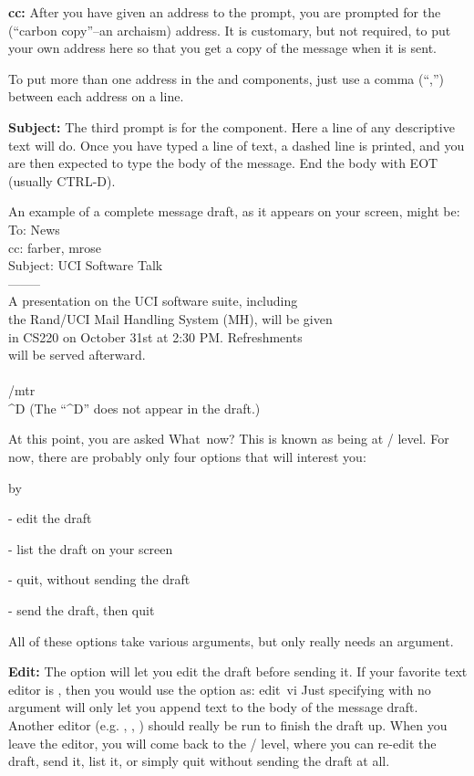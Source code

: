 {\bf cc:}
After you have given an address to the  prompt, 
you are prompted for the 
(``carbon copy''--an archaism)
address.
It is customary, but not required, to put your own address
here so that you get a copy of the message when it is sent.

To put more than one address in the  and
 components,
just use a comma (``,'') between each address on a line.

{\bf Subject:}
The third prompt is for the  component.
Here a line of any descriptive text will do.
Once you have typed a line of text, a dashed line is printed,
and you are then expected to type the body of the message.
End the body with EOT (usually CTRL-D).

An example of a complete message draft, as it appears on your screen,
might be:
\example
    To: News\\
    cc: farber, mrose\\
    Subject: UCI Software Talk\\
    --------\\
    A presentation on the UCI software suite, including\\
    the Rand/UCI Mail Handling System (MH), will be given\\
    in CS220 on October 31st at 2:30 PM.  Refreshments\\
    will be served afterward.\\\\
    /mtr\\
    \^{}D
\endexample
(The ``\^{}D'' does not appear in the draft.)

At this point, you are asked
\example What\ now?\endexample
This is known as being at \whatnow/ level.
For now, there are probably only four options that will interest you:
\smallskip
{\advance\leftskip by\parindent
\item{} - edit the draft
\item{} - list the draft on your screen
\item{} - quit, without sending the draft
\item{} - send the draft, then quit
\medskip}
\noindent
All of these options take various arguments,
but only  really needs an argument.

{\bf Edit:}
The  option will let you edit the draft before sending it.
If your favorite text editor is ,
then you would use the  option as:
\example edit\ vi\endexample
Just specifying  with no argument
will only let you append text to the body of the
message draft.
Another editor (e.g. , , )
should really be run to finish the draft up.
When you leave the editor, you will come back to the \whatnow/ level,
where you can re-edit the draft, send it, list it, or simply quit
without sending the draft at all.

